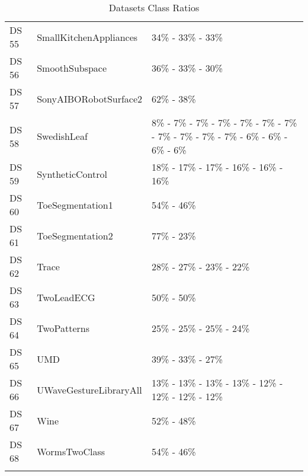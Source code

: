 {\begin{longtable}{|ll|p{17cm}|}
		DS 55 & SmallKitchenAppliances & 34\% - 33\% - 33\% \\
		DS 56 & SmoothSubspace & 36\% - 33\% - 30\% \\
		DS 57 & SonyAIBORobotSurface2 & 62\% - 38\% \\
		DS 58 & SwedishLeaf & 8\% - 7\% - 7\% - 7\% - 7\% - 7\% - 7\% - 7\% - 7\% - 7\% - 7\% - 6\% - 6\% - 6\% - 6\% \\
		DS 59 & SyntheticControl & 18\% - 17\% - 17\% - 16\% - 16\% - 16\% \\
		DS 60 & ToeSegmentation1 & 54\% - 46\% \\
		DS 61 & ToeSegmentation2 & 77\% - 23\% \\
		DS 62 & Trace & 28\% - 27\% - 23\% - 22\% \\
		DS 63 & TwoLeadECG & 50\% - 50\% \\
		DS 64 & TwoPatterns & 25\% - 25\% - 25\% - 24\% \\
		DS 65 & UMD & 39\% - 33\% - 27\% \\
		DS 66 & UWaveGestureLibraryAll & 13\% - 13\% - 13\% - 13\% - 12\% - 12\% - 12\% - 12\% \\
		DS 67 & Wine & 52\% - 48\% \\
		DS 68 & WormsTwoClass & 54\% - 46\% \\
		\hline
		\caption{Datasets Class Ratios}
		\label{tab:datasets-class-ratios}
	\end{longtable}
}
